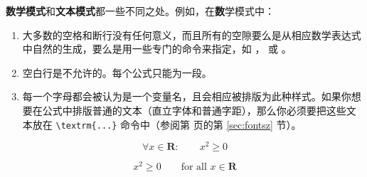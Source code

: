 \textbf{数学模式}和\textbf{文本模式}都一些不同之处。例如，在{\textbf
数学模式}中：
\begin{enumerate}

%
%


\item 大多数的空格和断行没有任何意义，而且所有的空隙要么是从相应数学表达式中自然的生成，要么是用一些专门的命令来指定，如 \ci{,}，   或 。
\item 空白行是不允许的。每个公式只能为一段。
\item 每一个字母都会被认为是一个变量名，且会相应被排版为此种样式。如果你想要在公式中排版普通的文本（直立字体和普通字距），那么你必须要把这些文本放在 \verb|\textrm{...}| 命令中（参阅第 \pageref{sec:fontsz} 页的第 \ref{sec:fontsz} 节）。
\end{enumerate}



\begin{example}
\begin{equation}
\forall x \in \mathbf{R}:
\qquad x^{2} \geq 0
\end{equation}
\end{example}
\begin{example}
\begin{equation}
x^{2} \geq 0\qquad
\textrm{for all }x\in\mathbf{R}
\end{equation}
\end{example}


%
%

